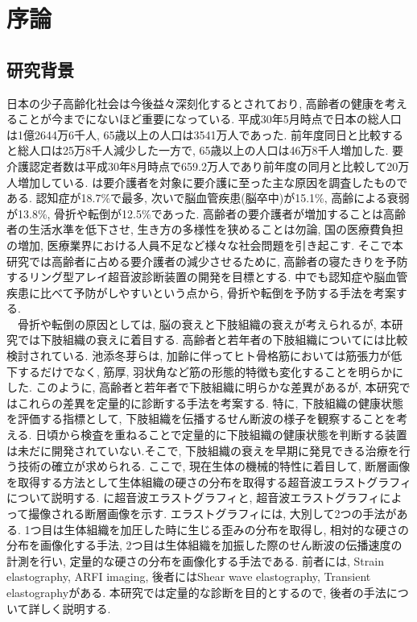 \chapter{序論}
\newpage
\section{研究背景}
日本の少子高齢化社会は今後益々深刻化するとされており, 高齢者の健康を考えることが今までにないほど重要になっている. 平成30年5月時点で日本の総人口は1億2644万6千人, 65歳以上の人口は3541万人であった. 前年度同日と比較すると総人口は25万8千人減少した一方で, 65歳以上の人口は46万8千人増加した\cite{jinkou}. 要介護認定者数は平成30年8月時点で659.2万人であり前年度の同月と比較して20万人増加している\cite{youkaigo1}\cite{youkaigo2}. は要介護者を対象に要介護に至った主な原因を調査したものである. 認知症が18.7\%で最多, 次いで脳血管疾患(脳卒中)が15.1\%, 高齢による衰弱が13.8\%, 骨折や転倒が12.5\%であった\cite{kaigogenin}. 高齢者の要介護者が増加することは高齢者の生活水準を低下させ, 生き方の多様性を狭めることは勿論, 国の医療費負担の増加, 医療業界における人員不足など様々な社会問題を引き起こす. そこで本研究では高齢者に占める要介護者の減少させるために, 高齢者の寝たきりを予防するリング型アレイ超音波診断装置の開発を目標とする. 中でも認知症や脳血管疾患に比べて予防がしやすいという点から, 骨折や転倒を予防する手法を考案する. 
\\\ \ 骨折や転倒の原因としては, 脳の衰えと下肢組織の衰えが考えられるが, 本研究では下肢組織の衰えに着目する. 高齢者と若年者の下肢組織についてには比較検討されている. 池添冬芽らは, 加齢に伴ってヒト骨格筋においては筋張力が低下するだけでなく, 筋厚, 羽状角など筋の形態的特徴も変化することを明らかにした\cite{danmen}. このように, 高齢者と若年者で下肢組織に明らかな差異があるが, 本研究ではこれらの差異を定量的に診断する手法を考案する. 特に, 下肢組織の健康状態を評価する指標として, 下肢組織を伝播するせん断波の様子を観察することを考える. 日頃から検査を重ねることで定量的に下肢組織の健康状態を判断する装置は未だに開発されていない.そこで, 下肢組織の衰えを早期に発見できる治療を行う技術の確立が求められる. ここで, 現在生体の機械的特性に着目して, 断層画像を取得する方法として生体組織の硬さの分布を取得する超音波エラストグラフィについて説明する.  に超音波エラストグラフィと, 超音波エラストグラフィによって撮像される断層画像を示す. エラストグラフィには, 大別して2つの手法がある. 1つ目は生体組織を加圧した時に生じる歪みの分布を取得し,  相対的な硬さの分布を画像化する手法, 2つ目は生体組織を加振した際のせん断波の伝播速度の計測を行い, 定量的な硬さの分布を画像化する手法である. 前者には, Strain elastography, ARFI imaging, 後者にはShear wave elastography, Transient elastographyがある. 本研究では定量的な診断を目的とするので, 後者の手法について詳しく説明する. 
